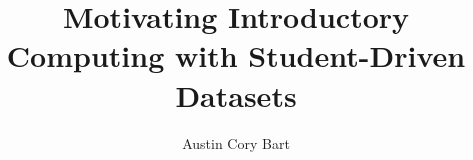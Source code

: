 \documentclass[onecolumn,12pt]{article}
\begin{document}
    
\title{Motivating Introductory Computing with Student-Driven Datasets} 

\author{Austin Cory Bart}
\maketitle     

\newpage
\tableofcontents
\listoffigures
\listoftables

\newpage   

    
\newpage
{}
\setcounter{page}{1}
        
    
    
    
    
    
    
    
    
    
		
    
\newpage
		
		
\newpage
\setcounter{page}{1}

    
    
    
        
\end{document}
